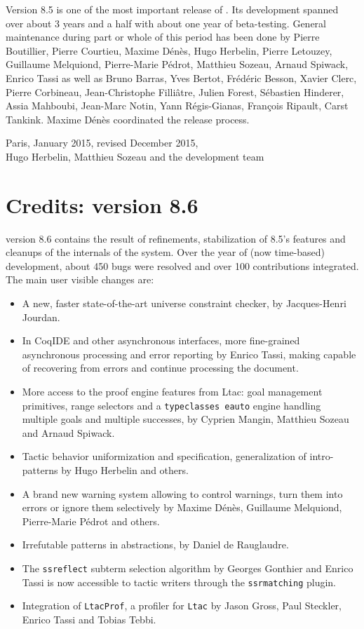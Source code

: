 Version 8.5 is one of the most important release of {\Coq}. Its
development spanned over about 3 years and a half with about one year
of beta-testing. General maintenance during part or whole of this
period has been done by Pierre Boutillier, Pierre Courtieu, Maxime
Dénès, Hugo Herbelin, Pierre Letouzey, Guillaume Melquiond,
Pierre-Marie Pédrot, Matthieu Sozeau, Arnaud Spiwack, Enrico Tassi as
well as Bruno Barras, Yves Bertot, Frédéric Besson, Xavier Clerc,
Pierre Corbineau, Jean-Christophe Filliâtre, Julien Forest, Sébastien
Hinderer, Assia Mahboubi, Jean-Marc Notin, Yann Régis-Gianas, François
Ripault, Carst Tankink. Maxime Dénès coordinated the release process.

\begin{flushright}
Paris, January 2015, revised December 2015,\\
Hugo Herbelin, Matthieu Sozeau and the {\Coq} development team\\
\end{flushright}

\section*{Credits: version 8.6}

{\Coq} version 8.6 contains the result of refinements, stabilization of
8.5's features and cleanups of the internals of the system. Over the
year of (now time-based) development, about 450 bugs were resolved and
over 100 contributions integrated. The main user visible changes are:
\begin{itemize}
\item A new, faster state-of-the-art universe constraint checker, by
  Jacques-Henri Jourdan.
\item In CoqIDE and other asynchronous interfaces, more fine-grained
  asynchronous processing and error reporting by Enrico Tassi, making {\Coq}
  capable of recovering from errors and continue processing the document.
\item More access to the proof engine features from Ltac: goal
  management primitives, range selectors and a {\tt typeclasses
    eauto} engine handling multiple goals and multiple successes, by
  Cyprien Mangin, Matthieu Sozeau and Arnaud Spiwack.
\item Tactic behavior uniformization and specification, generalization
  of intro-patterns by Hugo Herbelin and others.
\item A brand new warning system allowing to control warnings, turn them
  into errors or ignore them selectively by Maxime Dénès, Guillaume
  Melquiond, Pierre-Marie Pédrot and others.
\item Irrefutable patterns in abstractions, by Daniel de Rauglaudre.
\item The {\tt ssreflect} subterm selection algorithm by Georges Gonthier and
  Enrico Tassi is now accessible to tactic writers through the {\tt ssrmatching}
  plugin.
\item Integration of {\tt LtacProf}, a profiler for {\tt Ltac} by Jason
  Gross, Paul Steckler, Enrico Tassi and Tobias Tebbi.
\end{itemize}

